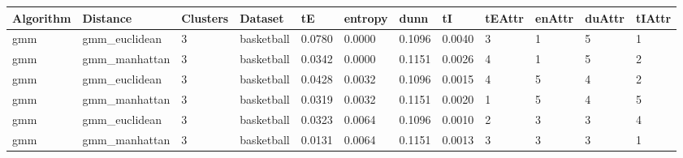 \documentclass[
]{article}
\begin{document}
\begin{longtable}{| p{1.1cm} | p{2cm} | p{0.8cm} | p{1.3cm} | p{0.60cm} | p{0.7cm} | p{0.65cm} | p{0.65cm} | p{0.65cm} | p{0.65cm} | p{0.7cm} | p{0.65cm} |}
\hline
\scriptsize  Algorithm & \scriptsize  Distance  &  \scriptsize Clusters & \scriptsize  Dataset & \scriptsize tE & \scriptsize entropy & \scriptsize  dunn  & \scriptsize tI & \scriptsize tEAttr & \scriptsize enAttr & \scriptsize duAttr & \scriptsize tIAttr  \\
\hline
\scriptsize      gmm     & \scriptsize  gmm\_euclidean & \scriptsize    3     & \scriptsize basketball & \scriptsize    0.0780    & \scriptsize 0.0000  & \scriptsize 0.1096 & \scriptsize    0.0040    & \scriptsize        3         & \scriptsize     1       & \scriptsize      5    & \scriptsize        1 \\
\cline{2-12}
\scriptsize      gmm     & \scriptsize  gmm\_manhattan & \scriptsize    3     & \scriptsize basketball & \scriptsize    0.0342    & \scriptsize 0.0000  & \scriptsize 0.1151 & \scriptsize    0.0026    & \scriptsize        4         & \scriptsize     1       & \scriptsize      5    & \scriptsize        2 \\
\cline{2-12}
\scriptsize      gmm     & \scriptsize  gmm\_euclidean & \scriptsize    3     & \scriptsize basketball & \scriptsize    0.0428    & \scriptsize 0.0032  & \scriptsize 0.1096 & \scriptsize    0.0015    & \scriptsize        4         & \scriptsize     5       & \scriptsize      4    & \scriptsize        2 \\
\cline{2-12}
\scriptsize      gmm     & \scriptsize  gmm\_manhattan & \scriptsize    3     & \scriptsize basketball & \scriptsize    0.0319    & \scriptsize 0.0032  & \scriptsize 0.1151 & \scriptsize    0.0020    & \scriptsize        1         & \scriptsize     5       & \scriptsize      4    & \scriptsize        5 \\
\cline{2-12}
\scriptsize      gmm     & \scriptsize  gmm\_euclidean & \scriptsize    3     & \scriptsize basketball & \scriptsize    0.0323    & \scriptsize 0.0064  & \scriptsize 0.1096 & \scriptsize    0.0010    & \scriptsize        2         & \scriptsize     3       & \scriptsize      3    & \scriptsize        4 \\
\cline{2-12}
\scriptsize      gmm     & \scriptsize  gmm\_manhattan & \scriptsize    3     & \scriptsize basketball & \scriptsize    0.0131    & \scriptsize 0.0064  & \scriptsize 0.1151 & \scriptsize    0.0013    & \scriptsize        3         & \scriptsize     3       & \scriptsize      3    & \scriptsize        1 \\

\end{longtable}
\end{document}
